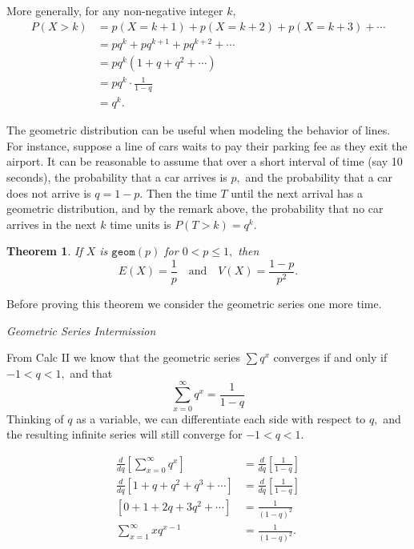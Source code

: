 \documentclass[
]{book}
\newtheorem{theorem}{Theorem}[chapter]
\theoremstyle{definition}
\theoremstyle{definition}
\theoremstyle{definition}
\theoremstyle{definition}
\theoremstyle{remark}
\begin{document}
More generally, for any non-negative integer \(k,\)
\begin{align*}
P(X > k) &= p(X=k+1)+p(X=k+2)+p(X=k+3)+\cdots \\
        &= pq^k + pq^{k+1}+pq^{k+2}+\cdots \\
        &= pq^k(1 + q + q^2 + \cdots)\\
        &= pq^k\cdot\frac{1}{1-q}\\
        &= q^k.
\end{align*}

The geometric distribution can be useful when modeling the behavior of lines. For instance, suppose a line of cars waits to pay their parking fee as they exit the airport. It can be reasonable to assume that over a short interval of time (say 10 seconds), the probability that a car arrives is \(p,\) and the probability that a car does not arrive is \(q = 1-p.\) Then the time \(T\) until the next arrival has a geometric distribution, and by the remark above, the probability that no car arrives in the next \(k\) time units is \(P(T > k) = q^k\).

\begin{theorem}
\protect\hypertarget{thm:geometric-EandV}{}\label{thm:geometric-EandV}If \(X\) is \(\texttt{geom}(p)\) for \(0 < p \leq 1,\) then \[E(X) = \frac{1}{p}~~~\text{ and }~~~  V(X) = \frac{1-p}{p^2}.\]
\end{theorem}

Before proving this theorem we consider the geometric series one more time.

\emph{Geometric Series Intermission}

From Calc II we know that the geometric series \(\sum q^x\) converges if and only if \(-1 < q < 1,\) and that \[\sum_{x = 0}^\infty q^x=\frac{1}{1-q} \tag{provided |q|<1}\] Thinking of \(q\) as a variable, we can differentiate each side with respect to \(q,\) and the resulting infinite series will still converge for \(-1 < q < 1\).

\begin{align*}
\frac{d}{dq}\left[\sum_{x = 0}^\infty q^x\right] &= \frac{d}{dq}\left[\frac{1}{1-q}\right] \\
\frac{d}{dq}\left[1+q+q^2 + q^3 + \cdots \right] &= \frac{d}{dq}\left[\frac{1}{1-q}\right] \\
\left[0 + 1 + 2q + 3q^2 + \cdots\right] &= \frac{1}{(1-q)^2}\\
\sum_{x = 1}^\infty x q^{x-1} &= \frac{1}{(1-q)^2}.
\end{align*}
\end{document}

